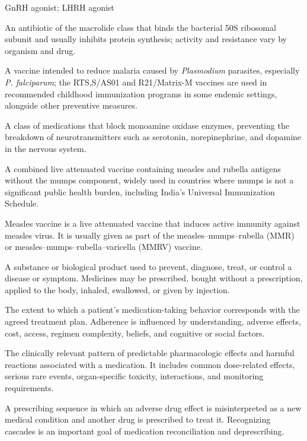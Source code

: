 \synonyms
GnRH agonist; LHRH agonist

 An antibiotic of the macrolide class that binds the bacterial 50S ribosomal subunit and usually inhibits protein synthesis; activity and resistance vary by organism and drug.

 A vaccine intended to reduce malaria caused by \textit{Plasmodium} parasites, especially \textit{P. falciparum}; the RTS,S/AS01 and R21/Matrix-M vaccines are used in recommended childhood immunization programs in some endemic settings, alongside other preventive measures.


 A class of medications that block monoamine oxidase enzymes, preventing the breakdown of neurotransmitters such as serotonin, norepinephrine, and dopamine in the nervous system.


 A combined live attenuated vaccine containing measles and rubella antigens without the
mumps component, widely used in countries where mumps is not a significant public health
burden, including India's Universal Immunization Schedule.

 Measles vaccine is a live attenuated vaccine that induces active immunity against measles virus. It is usually given as part of the measles--mumps--rubella (MMR) or measles--mumps--rubella--varicella (MMRV) vaccine.

 A substance or biological product used to prevent, diagnose, treat, or control a disease or symptom. Medicines may be prescribed, bought without a prescription, applied to the body, inhaled, swallowed, or given by injection.

 The extent to which a patient’s medication-taking behavior corresponds with the agreed
treatment plan. Adherence is influenced by understanding, adverse effects, cost, access,
regimen complexity, beliefs, and cognitive or social factors.

 The clinically relevant pattern of predictable pharmacologic effects and harmful
reactions associated with a medication. It includes common dose-related effects, serious
rare events, organ-specific toxicity, interactions, and monitoring requirements.

 A prescribing sequence in which an adverse drug effect is misinterpreted as a new
medical condition and another drug is prescribed to treat it. Recognizing cascades is an
important goal of medication reconciliation and deprescribing.

